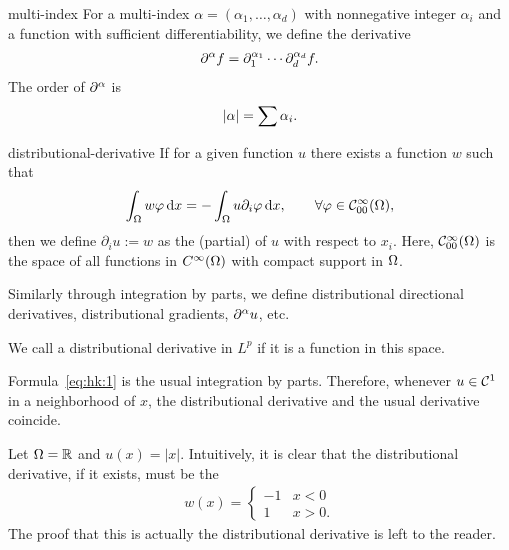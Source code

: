 \begin{Notation}{multi-index}
  For a multi-index $\alpha = (\alpha_1,\dots,\alpha_d)$ with
  nonnegative integer $\alpha_i$ and a function with sufficient
  differentiability, we define the derivative
  \begin{gather*}
    \partial^\alpha f = \partial_1^{\alpha_1}\cdots\partial_d^{\alpha_d} f.
  \end{gather*}
  The order of $\partial^\alpha$ is
  \begin{gather*}
    \lvert\alpha\rvert = \sum \alpha_i.
  \end{gather*}
\end{Notation}

\begin{Definition}{distributional-derivative}
  If for a given function $u$ there exists a function $w$ such that
  \begin{gather}
    \label{eq:hk:1}
     \int_\Omega w \varphi \,\mathrm{d} x
     =
     -\int_\Omega u \partial_i \varphi \,\mathrm{d} x,
     \qquad\forall \varphi\in \mathcal C_{00}^\infty(\Omega),
  \end{gather}
  then we define $\partial_i u := w$ as the  (partial) of $u$ with respect to $x_i$. Here,
  $\mathcal C_{00}^\infty(\Omega)$ is the space of all functions in $C^\infty(\Omega)$
  with compact support in $\Omega$.

  Similarly through integration by parts, we define distributional
  directional derivatives, distributional gradients, $\partial^\alpha u$,
  etc.

  We call a distributional derivative  in
  $L^p$ if it is a function in this space.
\end{Definition}

\begin{remark}
  Formula~\eqref{eq:hk:1} is the usual integration by
  parts. Therefore, whenever $u\in\mathcal C^1$ in a neighborhood of $x$, the
  distributional derivative and the usual derivative coincide.
\end{remark}

\begin{example}
  Let $\Omega=\mathbb R$ and $u(x) = |x|$. Intuitively,
  it is clear that the distributional derivative, if it exists, must
  be the 
  \begin{gather}
    \label{eq:hk:2}
    w(x) =
    \begin{cases}
      -1 & x<0 \\ 1 & x>0.
    \end{cases}
  \end{gather}
  The proof that this is actually the distributional derivative is
  left to the reader.
\end{example}

